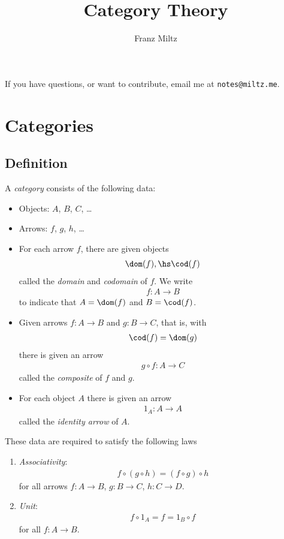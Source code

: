 \documentclass{article}
\begin{document}
\mkawodeythms
\title{Category Theory}
\author{Franz Miltz}
\maketitle
\noindent If you have questions, or want to contribute, email me at \texttt{notes@miltz.me}.
\tableofcontents
\pagebreak

\section{Categories}

\subsection{Definition}

\begin{definition}
	A \emph{category} consists of the following data:
	\begin{itemize}
		\item Objects: $A$, $B$, $C$, \dots
		\item Arrows: $f$, $g$, $h$, \dots
		\item For each arrow $f$, there are given objects \begin{align*}
			      \dom(f),\hs \cod(f)
		      \end{align*}
		      called the \emph{domain} and \emph{codomain} of $f$. We write
		      \begin{align*}
			      f:A\to B
		      \end{align*}
		      to indicate that $A=\dom(f)$ and $B=\cod(f)$.
		\item Given arrows $f:A\to B$ and $g:B\to C$, that is, with \begin{align*}
			      \cod(f) = \dom(g)
		      \end{align*}
		      there is given an arrow
		      \begin{align*}
			      g\circ f: A\to C
		      \end{align*}
		      called the \emph{composite} of $f$ and $g$.
		\item For each object $A$ there is given an arrow \begin{align*}
			      1_A : A\to A
		      \end{align*}
		      called the \emph{identity arrow} of $A$.
	\end{itemize}
	These data are required to satisfy the following laws \begin{enumerate}[label=C\arabic*.]
		\item \emph{Associativity}: \begin{align*}
			      f \circ (g \circ h) = (f\circ g) \circ h
		      \end{align*}
		      for all arrows $f:A\to B$, $g:B\to C$, $h:C\to D$.
		\item \emph{Unit}: \begin{align*}
			      f \circ 1_A = f = 1_B \circ f
		      \end{align*}
		      for all $f:A\to B$.
	\end{enumerate}
\end{definition}
\end{document}
